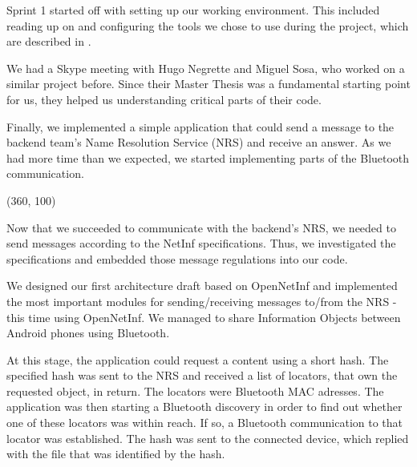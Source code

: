 Sprint 1 started off with setting up our working environment.
This included reading up on and configuring the tools we chose to use during the project,
which are described in .

We had a Skype meeting with Hugo Negrette and Miguel Sosa, who worked on a
similar project before. Since their Master Thesis was a fundamental starting point
for us, they helped us understanding critical parts of their code.

Finally, we implemented a simple application that could send a message to
the backend team's Name Resolution Service (NRS) and receive an answer. As
we had more time than we expected, we started implementing parts of
the Bluetooth communication.

\framebox(360, 100){
}

Now that we succeeded to communicate with the backend's NRS,
we needed to send messages according to the NetInf specifications.
Thus, we investigated the specifications and embedded those message regulations
into our code. 

We designed our first architecture draft based on OpenNetInf and implemented
the most important modules for sending/receiving messages to/from the NRS -
this time using OpenNetInf. We managed to share Information Objects between
Android phones using Bluetooth. 

At this stage, the application could request a content using a short hash.
The specified hash was sent to the NRS and received a list of locators, that own
the requested object, in return. The locators were Bluetooth MAC adresses.
The application was then starting a Bluetooth discovery in order to find out
whether one of these locators was within reach. If so, a Bluetooth communication
to that locator was established. The hash was sent to the connected device, which
replied with the file that was identified by the hash.


